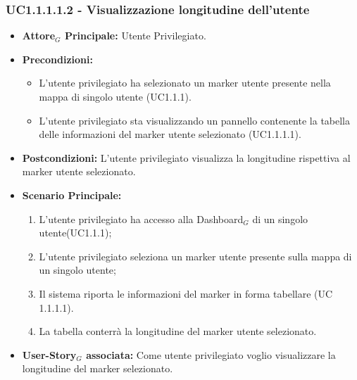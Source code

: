 \documentclass[11pt]{article}
\begin{document}
\begin{justify}
\subsubsection{\textbf{UC1.1.1.1.2 - Visualizzazione longitudine dell'utente}}
\label{UC1.1.1.1.2}
\begin{itemize}
     \item \textbf{Attore$_G$ Principale:} Utente Privilegiato.
     \item \textbf{Precondizioni:}
        \begin{itemize}
          \item L'utente privilegiato ha selezionato un marker utente presente nella mappa di singolo utente (UC1.1.1).
          \item L'utente privilegiato sta visualizzando un pannello contenente la tabella delle informazioni del marker utente selezionato (UC1.1.1.1).
        \end{itemize}
      \item \textbf{Postcondizioni:} L'utente privilegiato visualizza la longitudine rispettiva al marker utente selezionato. 
      \item \textbf{Scenario Principale:}
        \begin{enumerate}
            \item L'utente privilegiato ha accesso alla Dashboard$_G$ di un singolo utente(UC1.1.1);
            \item L'utente privilegiato seleziona un marker utente presente sulla mappa di un singolo utente;
            \item Il sistema riporta le informazioni del marker in forma tabellare (UC 1.1.1.1).
            \item La tabella conterrà la longitudine del marker utente selezionato.
        \end{enumerate}
     \item \textbf{User-Story$_G$ associata:}
       Come utente privilegiato voglio visualizzare la longitudine del marker selezionato.
\end{itemize}


\end{justify}
\end{document}
